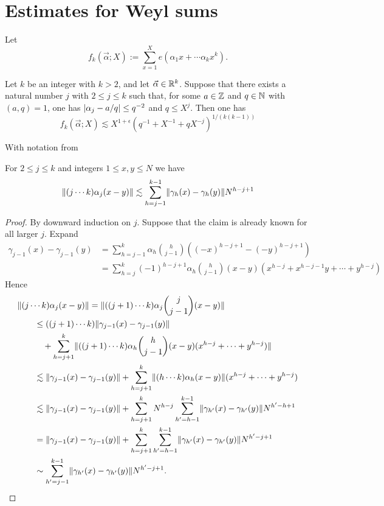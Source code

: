 \section{Estimates for Weyl sums}
\cite[Theorem 5.2]{MR1435742}
Let
\[
f_{k}(\vec\alpha; X) := \sum_{x=1}^{X} e(\alpha_{1}x + \dotsb \alpha_{k}x^{k}).
\]
\begin{theorem}
Let $k$ be an integer with $k > 2$, and let $\vec\alpha \in \mathbb{R}^{k}$.
Suppose that there exists a natural number $j$ with $2 \leq j \leq k$ such that, for some $a \in \mathbb{Z}$
and $q \in \mathbb{N}$ with $(a, q) = 1$, one has $\lvert\alpha_{j} - a/q\rvert \leq q^{-2}$ and $q \leq X^{j}$.
Then one has
\[
f_{k} (\vec\alpha; X) \lesssim X^{1+\epsilon} (q^{-1} + X^{-1} + qX^{-j} )^{1/(k(k-1))}
\]
\end{theorem}

With notation from \cite[Section 5.2]{MR1435742}
\begin{lemma}
For $2 \leq j \leq k$ and integers $1 \leq x,y \leq N$ we have
\[
\lVert(j \dotsm k) \alpha_{j}(x-y)\rVert
\lesssim
\sum_{h=j-1}^{k-1} \lVert \gamma_{h}(x) - \gamma_{h}(y) \rVert N^{h-j+1}
\]
\end{lemma}
\begin{proof}
By downward induction on $j$.
Suppose that the claim is already known for all larger $j$.
Expand
\begin{align*}
\gamma_{j-1}(x)-\gamma_{j-1}(y)
&=
\sum_{h=j-1}^{k} \alpha_{h} \binom{h}{j-1} ((-x)^{h-j+1}-(-y)^{h-j+1})
\\ &=
\sum_{h=j}^{k} (-1)^{h-j+1} \alpha_{h} \binom{h}{j-1} (x-y)(x^{h-j}+x^{h-j-1}y+\dotsb+y^{h-j})
\end{align*}
Hence
\begin{align*}
\MoveEqLeft
\norm{(j \dotsm k) \alpha_{j} (x-y)}
=
\norm{((j+1) \dotsm k) \alpha_{j} \binom{j}{j-1} (x-y)}
\\ &\leq
((j+1) \dotsm k) \norm{\gamma_{j-1}(x)-\gamma_{j-1}(y)}
\\ &\quad + \sum_{h=j+1}^{k} \norm{((j+1) \dotsm k) \alpha_{h} \binom{h}{j-1} (x-y)(x^{h-j}+\dotsb+y^{h-j})}
\\ &\lesssim
\norm{\gamma_{j-1}(x)-\gamma_{j-1}(y)} + \sum_{h=j+1}^{k} \norm{(h \dotsm k) \alpha_{h} (x-y)} (x^{h-j}+\dotsb+y^{h-j})
\\ &\lesssim
\norm{\gamma_{j-1}(x)-\gamma_{j-1}(y)} + \sum_{h=j+1}^{k} N^{h-j} \sum_{h'=h-1}^{k-1} \norm{\gamma_{h'}(x)-\gamma_{h'}(y)} N^{h'-h+1}
\\ &=
\norm{\gamma_{j-1}(x)-\gamma_{j-1}(y)} + \sum_{h=j+1}^{k} \sum_{h'=h-1}^{k-1} \norm{\gamma_{h'}(x)-\gamma_{h'}(y)} N^{h'-j+1}
\\ &\sim
\sum_{h'=j-1}^{k-1} \norm{\gamma_{h'}(x)-\gamma_{h'}(y)} N^{h'-j+1}.
\qedhere
\end{align*}
\end{proof}